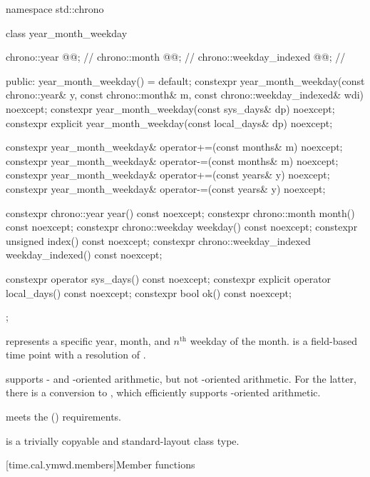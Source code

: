 \begin{codeblock}
namespace std::chrono {
  class year_month_weekday {
    chrono::year            @@;         // \expos
    chrono::month           @@;         // \expos
    chrono::weekday_indexed @@;       // \expos

  public:
    year_month_weekday() = default;
    constexpr year_month_weekday(const chrono::year& y, const chrono::month& m,
                                 const chrono::weekday_indexed& wdi) noexcept;
    constexpr year_month_weekday(const sys_days& dp) noexcept;
    constexpr explicit year_month_weekday(const local_days& dp) noexcept;

    constexpr year_month_weekday& operator+=(const months& m) noexcept;
    constexpr year_month_weekday& operator-=(const months& m) noexcept;
    constexpr year_month_weekday& operator+=(const years& y)  noexcept;
    constexpr year_month_weekday& operator-=(const years& y)  noexcept;

    constexpr chrono::year            year()            const noexcept;
    constexpr chrono::month           month()           const noexcept;
    constexpr chrono::weekday         weekday()         const noexcept;
    constexpr unsigned                index()           const noexcept;
    constexpr chrono::weekday_indexed weekday_indexed() const noexcept;

    constexpr          operator sys_days()   const noexcept;
    constexpr explicit operator local_days() const noexcept;
    constexpr bool ok() const noexcept;
  };
}
\end{codeblock}

\pnum
{} represents a specific year, month,
and $n^\text{th}$ weekday of the month.
 is a field-based time point with a resolution of .
\begin{note}
 supports - and -oriented arithmetic,
but not -oriented arithmetic.
For the latter, there is a conversion to ,
which efficiently supports -oriented arithmetic.
\end{note}
 meets the  () requirements.

\pnum
{} is a trivially copyable and standard-layout class type.

[time.cal.ymwd.members]{Member functions}

